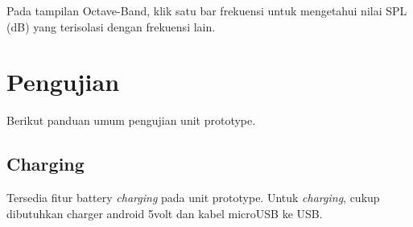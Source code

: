 \documentclass[12pt]{book}
\begin{document}
	Pada tampilan Octave-Band, klik satu bar frekuensi untuk mengetahui nilai SPL (dB)
	yang terisolasi dengan frekuensi lain.

    \chapter{Pengujian}

    Berikut panduan umum pengujian unit prototype.

    \section{Charging}

    Tersedia fitur battery \textit{charging} pada unit prototype.
    Untuk \textit{charging}, cukup dibutuhkan charger android 5volt dan kabel microUSB ke USB.
\end{document}
